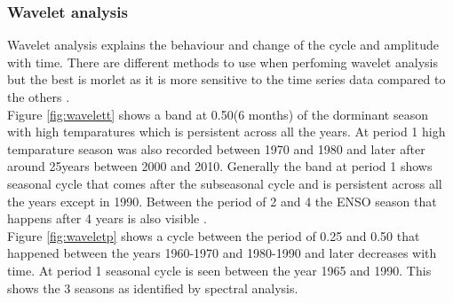 \documentclass[12pt,a4paper]{article}
\begin{document}
\subsubsection{Wavelet analysis}
Wavelet analysis explains the behaviour and change of the cycle and amplitude with time. There are different methods to use when perfoming wavelet analysis but the best is morlet as it is more sensitive to the time series data compared to the others \cite{daubechies1990wavelet}.\\
Figure \ref{fig:wavelett} shows a band at 0.50(6 months) of the dorminant season with high temparatures which is persistent across all the years. At period 1 high temparature season was also recorded between 1970 and 1980 and later after around 25years between 2000 and 2010. Generally the band at period 1 shows seasonal cycle that comes after the subseasonal cycle and is persistent across all the years except in 1990. Between the period of 2 and 4 the ENSO season that happens after 4 years is also visible \cite{torrence1998practical}.\\
Figure \ref{fig:waveletp} shows a cycle between the period of 0.25 and 0.50 that happened between the years 1960-1970 and 1980-1990 and later decreases with time. At period 1 seasonal cycle is seen between the year 1965 and 1990. This shows the 3 seasons as identified by spectral analysis.
\end{document}
